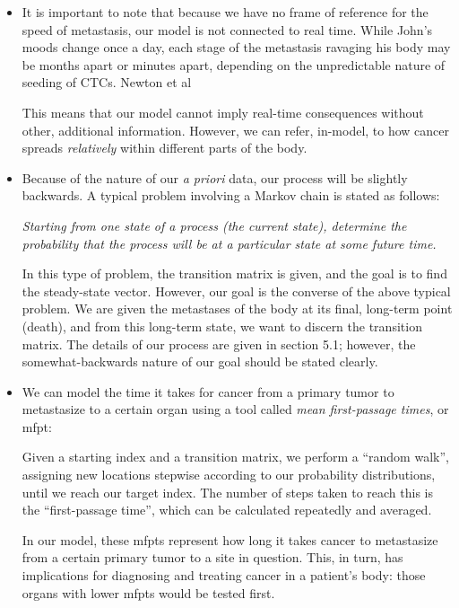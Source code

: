 \documentclass[letterpaper,12pt]{article}
\begin{document}
\begin{itemize}

\item It is important to note that because we have no frame of reference for the speed of metastasis, our model is not connected to real time. While John's moods change once a day, each stage of the metastasis ravaging his body may be months apart or minutes apart, depending on the unpredictable nature of seeding of CTCs. Newton et al \cite{newton}

This means that our model cannot imply real-time consequences without other, additional information. However, we can refer, in-model, to how cancer spreads \emph{relatively} within different parts of the body.

\item Because of the nature of our \emph{a priori} data, our process will be slightly backwards. A typical problem involving a Markov chain is stated as follows:

\emph{Starting from one state of a process (the current state), determine the probability that the process will be at a particular state at some future time.} 

In this type of problem, the transition matrix is given, and the goal is to find the steady-state vector. However, our goal is the converse of the above typical problem. We are given the metastases of the body at its final, long-term point (death), and from this long-term state, we want to discern the transition matrix. The details of our process are given in section 5.1; however, the somewhat-backwards nature of our goal should be stated clearly.

\item We can model the time it takes for cancer from a primary tumor to metastasize to a certain organ using a tool called \emph{mean first-passage times}, or mfpt:

Given a starting index and a transition matrix, we perform a ``random walk'', assigning new locations stepwise according to our probability distributions, until we reach our target index. The number of steps taken to reach this is the ``first-passage time'', which can be calculated repeatedly and averaged.

In our model, these mfpts represent how long it takes cancer to metastasize from a certain primary tumor to a site in question. This, in turn, has implications for diagnosing and treating cancer in a patient's body: those organs with lower mfpts would be tested first.

\end{itemize}
\end{document}
